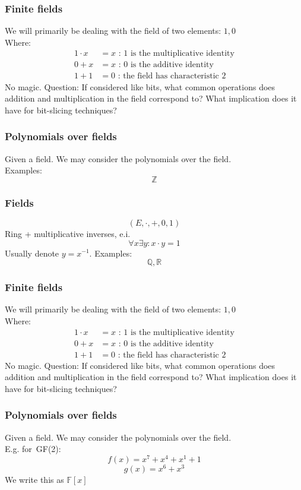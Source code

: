 \documentclass{beamer}
\begin{document}
\begin{frame}
\frametitle{Finite fields}
We will primarily be dealing with the field of two elements:
$1, 0$ \\
Where:
\begin{align}
    1 \cdot x &= x \text{ : 1 is the multiplicative identity} \\
    0 + x     &= x \text{ : 0 is the additive identity} \\
    1 + 1     &= 0 \text{ : the field has characteristic 2}
\end{align}
No magic.
Question:
If considered like bits, what common operations does
addition and multiplication in the field correspond to?
What implication does it have for bit-slicing techniques?
\end{frame}

\begin{frame}
\frametitle{Polynomials over fields}
Given a field. We may consider the polynomials over the field. \\
Examples:
\[
    \mathbb{Z}
\]
\end{frame}

\begin{frame}
\frametitle{Fields}
\[
    (E, \cdot, +, 0, 1)
\]
Ring + multiplicative inverses, e.i.
\[
    \forall x \exists y : x \cdot y = 1
\]
Usually denote $y = x^{-1}$. Examples:
\[
    \mathbb{Q}, \mathbb{R}
\]
\end{frame}

\begin{frame}
\frametitle{Finite fields}
We will primarily be dealing with the field of two elements:
$1, 0$ \\
Where:
\begin{align}
    1 \cdot x &= x \text{ : 1 is the multiplicative identity} \\
    0 + x     &= x \text{ : 0 is the additive identity} \\
    1 + 1     &= 0 \text{ : the field has characteristic 2}
\end{align}
No magic.
Question:
If considered like bits, what common operations does
addition and multiplication in the field correspond to?
What implication does it have for bit-slicing techniques?
\end{frame}

\begin{frame}
\frametitle{Polynomials over fields}
Given a field. We may consider the polynomials over the field. \\
E.g. for\ GF(2):
\[
    f(x) = x^{7} + x^{4} + x^{1} + 1
\]
\[
    g(x) = x^{6} + x^{3}
\]
We write this as $\mathbb{F}[x]$
\end{frame}
\end{document}

